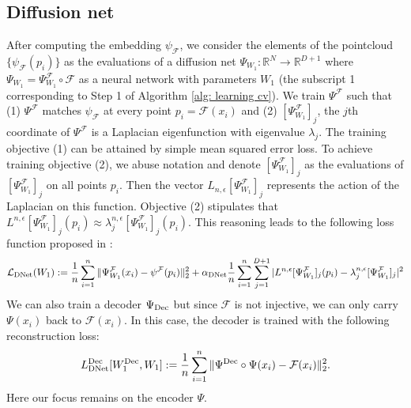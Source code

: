 \documentclass[reqno, 12pt]{article}
\begin{document}
\subsection{Diffusion net} After computing the embedding $\psi_{\mathcal{F}}$, we consider the elements of the pointcloud $\{\psi_{\mathcal{F}}(p_i)\}$ as the evaluations of a diffusion net $\Psi_{W_1}: \mathbb{R}^{N} \to \mathbb{R}^{D+1}$ where $\Psi_{W_1} = \Psi^{\mathcal{F}}_{W_1} \circ \mathcal{F}$ as a neural network with parameters $W_1$ (the subscript 1 corresponding to Step 1 of Algorithm \eqref{alg: learning cv}). We train $\Psi^{\mathcal{F}}$ such that (1) $\Psi^{\mathcal{F}}$ matches $\psi_{\mathcal{F}}$ at every point $p_i = \mathcal{F}(x_i)$ and (2) $[\Psi^{\mathcal{F}}_{W_1}]_{j}$, the $j$th coordinate of $\Psi^{\mathcal{F}}$ is a Laplacian eigenfunction with eigenvalue $\lambda_j$. The training objective (1) can be attained by simple mean squared error loss. To achieve training objective (2), we abuse notation and denote $[\Psi^{\mathcal{F}}_{W_1}]_j$ as the evaluations of $[\Psi^{\mathcal{F}}_{W_1}]_j$ on all points $p_i$. Then the vector $L_{n,\epsilon}[\Psi^{\mathcal{F}}_{W_1}]_j$ represents the action of the Laplacian on this function. Objective (2) stipulates that $L^{n,\epsilon}[\Psi^{\mathcal{F}}_{W_1}]_j(p_i) \approx \lambda^{n,\epsilon}_j[\Psi^{\mathcal{F}}_{W_1}]_j(p_i)$. This reasoning leads to the following loss function proposed in \cite{mishne2019diffusion}: 
\begin{align}
    \mathcal{L}_{\rm DNet}(W_1) := \frac{1}{n}\sum_{i=1}^{n}\|\Psi^{\mathcal{F}}_{W_1}(x_i) - \psi^{\mathcal{F}}(p_i)\|_{2}^{2} + \alpha_{\rm DNet}\frac{1}{n}\sum_{i=1}^{n}\sum_{j=1}^{D+1}|L^{n,\epsilon}[\Psi^{\mathcal{F}}_{W_1}]_j(p_i) - \lambda^{n,\epsilon}_{j}[\Psi^{\mathcal{F}}_{W_1}]_j|^2\label{eq: DNet loss}
\end{align}
We can also train a decoder $\Psi_{\rm Dec}$ but since $\mathcal{F}$ is not injective, we can only carry $\Psi(x_i)$ back to $\mathcal{F}(x_i)$. In this case, the decoder is trained with the following reconstruction loss: 
\begin{align}
    L^{\rm Dec}_{\rm DNet}[W^{\rm Dec}_{1},W_{1}] := \frac{1}{n}\sum_{i=1}^{n}\|\Psi^{\rm Dec} \circ \Psi (x_i) - \mathcal{F}(x_i)\|_{2}^{2}. \label{eq: DNet Featurized reconstruction loss}
\end{align} 
Here our focus remains on the encoder $\Psi$. 
\end{document}
